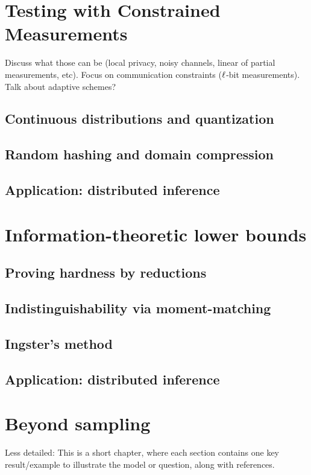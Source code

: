 \documentclass[biber]{nowfnt} %
\begin{document}
\chapter{Testing with Constrained Measurements}
Discuss what those can be (local privacy, noisy channels, linear of
partial measurements, etc). Focus on communication constraints ($\ell$-bit
measurements). Talk about adaptive schemes?
\section{Continuous distributions and quantization}
\section{Random hashing and domain compression}
\section{Application: distributed inference}

\chapter{Information-theoretic lower bounds}
\section{Proving hardness by reductions}
\section{Indistinguishability via moment-matching}
\section{Ingster's method}
\section{Application: distributed inference}

\chapter{Beyond \iid sampling}
Less detailed: This is a short chapter, where each section contains one key result/example
to illustrate the model or question, along with references.
\end{document}
